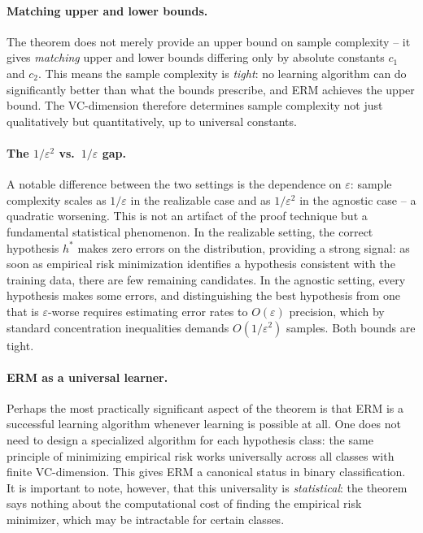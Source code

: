 \paragraph{Matching upper and lower bounds.}
The theorem does not merely provide an upper bound on sample complexity -- it gives
\emph{matching} upper and lower bounds differing only by absolute constants $c_1$ and $c_2$.
This means the sample complexity is \emph{tight}: no learning algorithm can do significantly
better than what the bounds prescribe, and ERM achieves the upper bound. The VC-dimension
therefore determines sample complexity not just qualitatively but quantitatively, up to
universal constants.

\paragraph{The $1/\varepsilon^2$ vs.\ $1/\varepsilon$ gap.}
A notable difference between the two settings is the dependence on $\varepsilon$: sample
complexity scales as $1/\varepsilon$ in the realizable case and as $1/\varepsilon^2$ in the
agnostic case -- a quadratic worsening. This is not an artifact of the proof technique but a
fundamental statistical phenomenon. In the realizable setting, the correct hypothesis $h^*$
makes zero errors on the distribution, providing a strong signal: as soon as empirical risk
minimization identifies a hypothesis consistent with the training data, there are few remaining
candidates. In the agnostic setting, every hypothesis makes some errors, and distinguishing
the best hypothesis from one that is $\varepsilon$-worse requires estimating error rates to
$O(\varepsilon)$ precision, which by standard concentration inequalities demands
$O(1/\varepsilon^2)$ samples. Both bounds are tight.

\paragraph{ERM as a universal learner.}
Perhaps the most practically significant aspect of the theorem is that ERM is a successful
learning algorithm whenever learning is possible at all. One does not need to design a
specialized algorithm for each hypothesis class: the same principle of minimizing empirical
risk works universally across all classes with finite VC-dimension. This gives ERM a canonical
status in binary classification. It is important to note, however, that this universality is
\emph{statistical}: the theorem says nothing about the computational cost of finding the
empirical risk minimizer, which may be intractable for certain classes.

